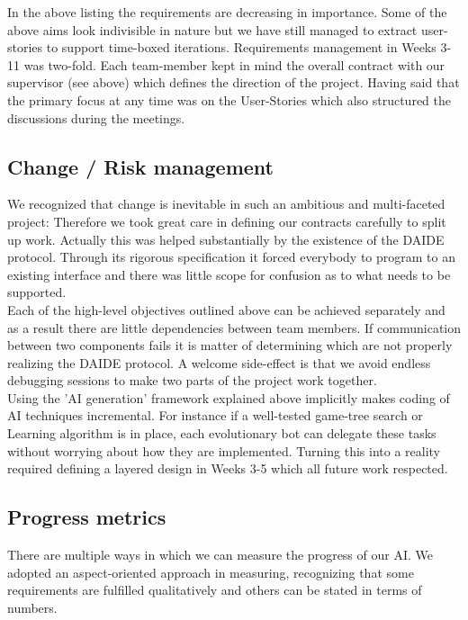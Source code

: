 \documentclass[11pt]{article}
\begin{document}
In the above listing the requirements are decreasing in importance. Some of
the above aims look indivisible in nature but we have still managed to
extract user-stories to support time-boxed iterations. Requirements management
in Weeks 3-11 was two-fold. Each team-member kept in mind the overall contract
with our supervisor (see above) which defines the direction of the project. 
Having said that the primary focus at any time was on the User-Stories which
also structured the discussions during the meetings.

\subsection{Change / Risk management}
We recognized that change is inevitable in such an ambitious and multi-faceted
project: Therefore we took great care in defining our contracts carefully to
split up work. Actually this was helped substantially by the existence of the
DAIDE protocol. Through its rigorous specification it forced everybody to 
program to an existing interface and there was little scope for confusion as
to what needs to be supported. 
\\
Each of the high-level objectives outlined above can be achieved
separately and as a result there are little dependencies between team members.
If communication between two components fails it is matter of determining
which are not properly realizing the DAIDE protocol. A welcome side-effect
is that we avoid endless debugging sessions to make two parts of the project
work together.
\\
Using the 'AI generation' framework explained above implicitly makes coding 
of AI techniques incremental. For instance if a well-tested game-tree search
or Learning algorithm is in place, each evolutionary bot can delegate
these tasks without worrying about how they are implemented. Turning this
into a reality required defining a layered design in Weeks 3-5 which all
future work respected.
\\ 

\subsection{Progress metrics}
There are multiple ways in which we can measure the progress of our AI. 
We adopted an aspect-oriented approach in measuring, recognizing that 
some requirements are fulfilled qualitatively and others can be stated
in terms of numbers.
\end{document}
